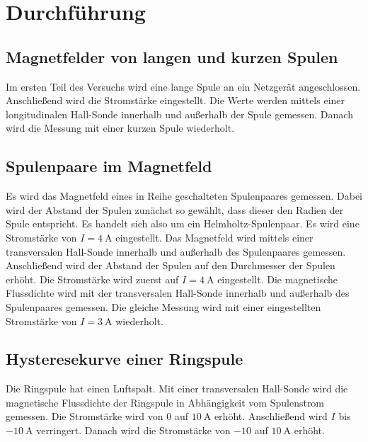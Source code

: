 \section{Durchführung}
\label{sec:Durchfuehrung}

\subsection{Magnetfelder von langen und kurzen Spulen}
Im ersten Teil des Versuchs wird eine lange Spule an ein Netzgerät angeschlossen. 
Anschließend wird die Stromstärke eingestellt.
Die Werte werden mittels einer longitudinalen Hall-Sonde innerhalb und außerhalb der
Spule gemessen. Danach wird die Messung mit einer kurzen Spule 
wiederholt. 

\subsection{Spulenpaare im Magnetfeld} %
Es wird das Magnetfeld eines in Reihe geschalteten Spulenpaares gemessen. Dabei wird
der Abstand der Spulen zunächst so gewählt, dass dieser den Radien der Spule entspricht.
Es handelt sich also um ein Helmholtz-Spulenpaar. Es wird eine Stromstärke von
$I= \SI{4}{\ampere}$ eingestellt. Das Magnetfeld wird mittels einer 
transversalen Hall-Sonde innerhalb und außerhalb des Spulenpaares gemessen.
\newline
Anschließend wird der Abstand der Spulen auf den Durchmesser der Spulen erhöht.
Die Stromstärke wird zuerst auf $I= \SI{4}{\ampere}$ eingestellt.
Die magnetische Flussdichte wird mit der transversalen Hall-Sonde innerhalb und
außerhalb des Spulenpaares gemessen.
\newline
Die gleiche Messung wird mit einer eingestellten Stromstärke von
$I = \SI{3}{\ampere}$ wiederholt.

\subsection {Hysteresekurve einer Ringspule} 
Die Ringspule hat einen Luftspalt. Mit einer transversalen Hall-Sonde wird die 
magnetische Flussdichte der Ringspule in Abhängigkeit vom Spulenstrom gemessen.
Die Stromstärke wird von $\num{0}$ auf $\SI{10}{\ampere}$ erhöht.
Anschließend wird $I$ bis $\SI{-10}{\ampere}$ verringert. Danach wird die Stromstärke
von $\num{-10}$ auf $\SI{10}{\ampere}$ erhöht.


